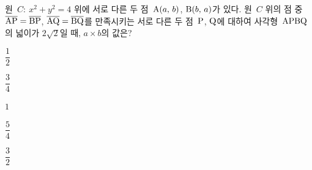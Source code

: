 원~$C:\ x^2+y^2=4$ 위에 서로 다른 두 점~$\mathrm{A}(a,\mkern3mu b)$, $\mathrm{B}(b,\mkern3mu a)$가 있다. 원~$C$ 위의 점 중 $\overline{\mathrm{AP}}=\overline{\mathrm{BP}}$, $\overline{\mathrm{AQ}}=\overline{\mathrm{BQ}}$를 만족시키는 서로 다른 두 점~$\mathrm{P}$, $\mathrm{Q}$에 대하여 사각형~$\mathrm{APBQ}$의 넓이가 $2\sqrt{2}$일 때, $a\times b$의 값은?
\begin{choices32}{\rule[-3ex]{0pt}{8ex}$\dfrac{1}{2}$}{\rule[-3ex]{0pt}{8ex}$\dfrac{3}{4}$}{\rule[-3ex]{0pt}{8ex}$1$}{\rule[-3ex]{0pt}{8ex}$\dfrac{5}{4}$}{\rule[-3ex]{0pt}{8ex}$\dfrac{3}{2}$}\end{choices32}
